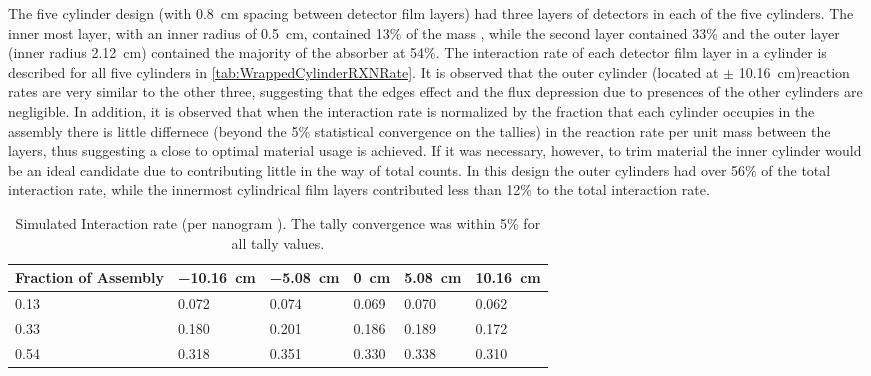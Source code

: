 The five cylinder design (with \SI{0.8}{\cm} spacing between detector film layers) had three layers of detectors in each of the five cylinders.
The inner most layer, with an inner radius of \SI{0.5}{\cm}, contained 13\% of the mass , while the second layer contained 33\%  and the outer layer (inner radius \SI{2.12}{\cm}) contained the majority of the absorber at 54\%.
The interaction rate of each detector film layer in a cylinder is described for all five cylinders in \autoref{tab:WrappedCylinderRXNRate}.
It is observed that the outer cylinder (located at $\pm$ \SI{10.16}{\cm})reaction rates are very similar to the other three, suggesting that the edges effect and the flux depression due to presences of the other cylinders are negligible.
In addition, it is observed that when the interaction rate is normalized by the fraction that each cylinder occupies in the assembly there is little differnece (beyond the 5\% statistical convergence on the tallies) in the reaction rate per unit mass between the layers, thus suggesting a close to optimal material usage is achieved.
If it was necessary, however, to trim material the inner cylinder would be an ideal candidate due to contributing little in the way of total counts.
In this design the outer cylinders had over 56\% of the total interaction rate, while the innermost cylindrical film layers contributed less than 12\% to the total interaction rate.
\begin{table}
	\caption[Neutron Interactions per Layer in Cylinder]{Simulated Interaction rate (per nanogram ). The tally convergence was within 5\% for all tally values.}
	\label{tab:WrappedCylinderRXNRate}
	\begin{tabular}{m{4cm} | m{2cm} m{1.75cm} m{1.5cm} m{1.5cm} m{1.5cm}}
		\toprule
		Fraction of Assembly & \SI{-10.16}{\cm} & \SI{-5.08}{\cm} & \SI{0}{\cm} & \SI{5.08}{\cm} & \SI{10.16}{\cm}\\
		\midrule
		0.13 & 0.072 & 0.074 & 0.069 & 0.070 & 0.062 \\
		0.33	& 0.180 & 0.201 & 0.186 & 0.189 & 0.172 \\
		0.54	& 0.318 & 0.351 & 0.330 & 0.338 & 0.310 \\
		\bottomrule
	\end{tabular}
\end{table}
